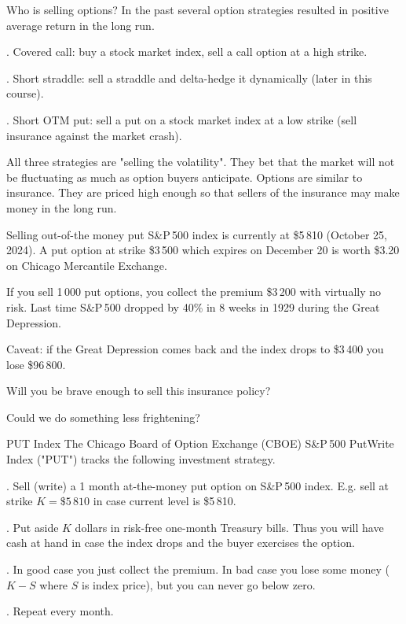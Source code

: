 \documentclass{beamer}
\begin{document}
\begin{frame}{Who is selling options?}
\justify
In the past several option strategies resulted in positive average return in the long run.

. Covered call: buy a stock market index, sell a call option at a high strike.

. Short straddle: sell a straddle and delta-hedge it dynamically (later in this course).

. Short OTM put: sell a put on a stock market index at a low strike (sell insurance against the market crash).

\justify
All three strategies are "selling the volatility". They bet that the market will not be fluctuating as much as option buyers anticipate. Options are similar to insurance. They are priced high enough so that sellers of the insurance may make money in the long run.
\end{frame}



\begin{frame}{Selling out-of-the money put}
\justify
S\&P\,500 index is currently at \$5\,810 (October 25, 2024). A put option at strike \$3\,500 which expires on December 20 is worth \$3.20 on Chicago Mercantile Exchange.

\justify
If you sell 1\,000 put options, you collect the premium \$3\,200 with virtually no risk. Last time S\&P\,500 dropped by 40\% in 8 weeks in 1929 during the Great Depression.

\justify
Caveat: if the Great Depression comes back and the index drops to \$3\,400 you lose \$96\,800.

\justify
Will you be brave enough to sell this insurance policy?

\justify
Could we do something less frightening?
\end{frame}



\begin{frame}{PUT Index}
\justify
The Chicago Board of Option Exchange  (CBOE) S\&P\,500 PutWrite Index ("PUT") tracks the following investment strategy.

. Sell (write) a 1 month at-the-money put option on S\&P\,500 index. E.g. sell at strike $K=\$5\,810$ in case current level is \$5\,810.

. Put aside $K$ dollars in risk-free one-month Treasury bills. Thus you will have cash at hand in case the index drops and the buyer exercises the option.

. In good case you just collect the premium. In bad case you lose some money ($K-S$ where $S$ is index price), but you can never go below zero.

. Repeat every month.
\end{frame}
\end{document}
